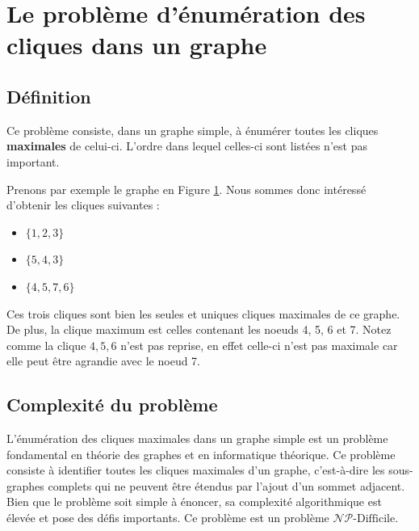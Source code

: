 \documentclass[12pt,a4paper]{article}
\begin{document}
\section{Le problème d'énumération des cliques dans un graphe}

\subsection{Définition}%
\label{subsec:def_prob}

Ce problème consiste, dans un graphe simple, à énumérer toutes les cliques \textbf{maximales} de celui-ci. L'ordre dans lequel celles-ci sont listées n'est pas important.

\begin{figure}[h]
  \begin{center}
    \caption{}
    \label{fig:x clique3}
  \end{center}
\end{figure}


Prenons par exemple le graphe en Figure \ref{fig:x clique3}. Nous sommes donc intéressé d'obtenir les cliques suivantes :
\begin{itemize}
        \item \(\{1, 2, 3\}\)
        \item \(\{5, 4, 3\}\)
        \item \(\{4, 5, 7, 6\}\)
\end{itemize}
Ces trois cliques sont bien les seules et uniques cliques maximales de ce graphe. De plus, la clique maximum est celles contenant les noeuds 4, 5, 6 et 7.
Notez comme la clique \({4, 5, 6}\) n'est pas reprise, en effet celle-ci n'est pas maximale car elle peut être agrandie avec le noeud 7.

\subsection{Complexité du problème}
L'énumération des cliques maximales dans un graphe simple est un problème fondamental en théorie des graphes et en informatique théorique. Ce problème consiste à identifier toutes les cliques maximales d'un graphe, c'est-à-dire les sous-graphes complets qui ne peuvent être étendus par l'ajout d'un sommet adjacent. Bien que le problème soit simple à énoncer, sa complexité algorithmique est élevée et pose des défis importants. Ce problème est un problème \(\mathcal{N}\mathcal{P}\text{-Difficile}\).
\end{document}
